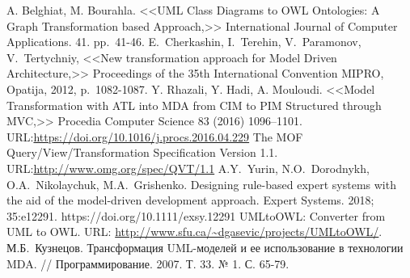 \documentclass[12pt]{article}
\begin{document}
\renewcommand\refname{\centering Литература}
\begin{thebibliography}{99}
 A. Belghiat, M. Bourahla. <<UML Class Diagrams to OWL Ontologies: A Graph Transformation based Approach,>> International Journal of Computer Applications. 41. pp.~41-46.
 E.~Cherkashin, I.~Terehin, V.~Paramonov, V.~Tertychniy, <<New transformation approach for Model Driven Architecture,>> Proceedings of the 35th International Convention MIPRO, Opatija, 2012, p.~1082-1087.
Y. Rhazali, Y. Hadi, A. Mouloudi. <<Model Transformation with ATL into MDA from CIM to PIM Structured through MVC,>> Procedia Computer Science 83 (2016) 1096–1101. URL:\url{https://doi.org/10.1016/j.procs.2016.04.229}
 The MOF Query/View/Transformation Specification Version 1.1. URL:\url{http://www.omg.org/spec/QVT/1.1}
 A.Y.~Yurin, N.O.~Dorodnykh, O.A.~Nikolaychuk, M.A.~Grishenko. Designing rule-based expert systems with the aid of the model-driven development approach. Expert Systems. 2018; 35:e12291. https://doi.org/10.1111/exsy.12291
 UMLtoOWL: Converter from UML to OWL. URL: \url{http://www.sfu.ca/~dgasevic/projects/UMLtoOWL/}.
М.Б.~Кузнецов. Трансформация UML-моделей и ее использование в технологии MDA. // Программирование. 2007. Т. 33. № 1. С. 65-79.


\end{thebibliography}
\end{document}
